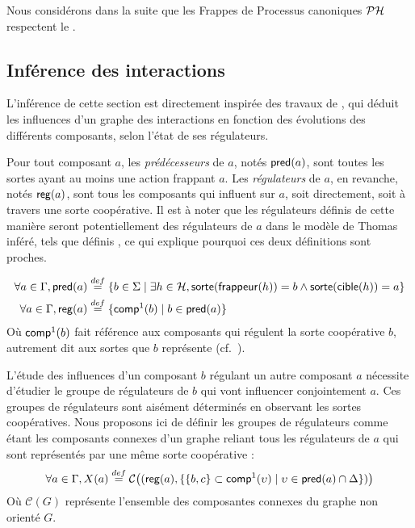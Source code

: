 Nous considérons dans la suite que les Frappes de Processus canoniques $\mathcal{PH}$ respectent
le .



\subsection{Inférence des interactions}


L'inférence de cette section est directement inspirée des travaux de ,
qui déduit les influences d'un graphe des interactions en fonction des évolutions des différents
composants, selon l'état de ses régulateurs.

\newcommand{\myupsilon}{\upsilon}

Pour tout composant $a$,
les \emph{prédécesseurs} de $a$, notés $\mathsf{pred}(a)$,
sont toutes les sortes ayant au moins une action frappant $a$.
Les \emph{régulateurs} de $a$, en revanche, notés $\mathsf{reg}(a)$, sont tous les composants
qui influent sur $a$, soit directement, soit à travers une sorte coopérative.
Il est à noter que les régulateurs définis de cette manière seront potentiellement
des régulateurs de $a$ dans le modèle de Thomas inféré,
tels que définis ,
ce qui explique pourquoi ces deux définitions sont proches.

\begin{align*}
  \forall a \in \mathrm{\Gamma}, \mathsf{pred}(a) &\stackrel{def}= \{ b \in \Sigma \mid
    \exists h \in \mathcal{H}, \mathsf{sorte}(\mathsf{frappeur}(h)) = b \wedge
    \mathsf{sorte}(\mathsf{cible}(h)) = a \} \\
  \forall a \in \mathrm{\Gamma}, \mathsf{reg}(a) &\stackrel{def}= \{ \mathsf{comp}^1(b) \mid
    b \in \mathsf{pred}(a) \}
\end{align*}
Où $\mathsf{comp}^1(b)$ fait référence aux composants qui régulent la sorte coopérative $b$,
autrement dit aux sortes que $b$ représente
(cf.~).

L'étude des influences d'un composant $b$ régulant un autre composant $a$ nécessite d'étudier
le groupe de régulateurs de $b$ qui vont influencer conjointement $a$.
Ces groupes de régulateurs sont aisément déterminés en observant les sortes coopératives.
Nous proposons ici de définir les groupes de régulateurs comme étant les composants connexes
d'un graphe reliant tous les régulateurs de $a$ qui sont représentés par une même sorte
coopérative :
\[
  \forall a \in \components,
  X(a) \DEF \mathcal{C} \big( (\reg(a),
  \{ \{b,c\} \subset \compin(\myupsilon) \mid
  \myupsilon \in \pred(a) \cap \cs \}) \big)
\]
Où $\mathcal{C}(G)$ représente l'ensemble des composantes connexes du graphe non orienté $G$.

